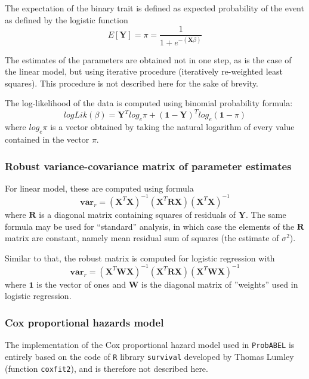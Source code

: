 \documentclass[12pt,a4paper]{article}
\begin{document}
The expectation of the binary trait is defined as expected 
probability of the event as defined by the logistic 
function 
$$
E[\mathbf{Y}] = \pi = \frac{ 1 }{ 1 + e^{-(\mathbf{X}\beta)} }
$$

The estimates of the parameters are obtained not in one 
step, as is the case of the linear model, but using iterative 
procedure (iteratively re-weighted least squares). This 
procedure is not described here for the sake of brevity. 

The log-likelihood of the data is computed using 
binomial probability formula:
$$
logLik(\beta) = \mathbf{Y}^T log_e \pi + (\mathbf{1} - \mathbf{Y})^T log_e (\mathbf{1}-\pi)
$$
where $log_e \pi$ is a vector obtained by taking the natural logarithm of every 
value contained in the vector $\pi$. 

\subsubsection{Robust variance-covariance matrix of parameter estimates}

For linear model, these are computed using formula
$$
\mathbf{var}_r = (\mathbf{X}^T\mathbf{X})^{-1} (\mathbf{X}^T\mathbf{R}\mathbf{X})
(\mathbf{X}^T\mathbf{X})^{-1}
$$
where $\mathbf{R}$ is a diagonal matrix containing squares of residuals
of $\mathbf{Y}$. The 
same formula may be used for ``standard'' analysis, in which case
the elements of the $\mathbf{R}$ matrix are constant, namely mean 
residual sum of squares (the estimate of $\sigma^2$).

Similar to that, the robust matrix is computed for logistic regression with
$$
\mathbf{var}_r = (\mathbf{X}^T \mathbf{W} \mathbf{X})^{-1} (\mathbf{X}^T\mathbf{R}\mathbf{X})
(\mathbf{X}^T \mathbf{W} \mathbf{X})^{-1}
$$
where $\mathbf{1}$ is the vector of ones and $\mathbf{W}$ is the diagonal matrix 
of ''weights'' used in logistic regression. 


\subsubsection{Cox proportional hazards model}

The implementation of the Cox proportional hazard model used 
in \texttt{ProbABEL} is entirely based on the code of \texttt{R} 
library \texttt{survival} developed by Thomas Lumley 
(function \texttt{coxfit2}), and is therefore not described here. 
\end{document}
